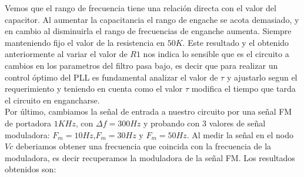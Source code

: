 \documentclass[10pt,a4paper]{IEEEtran}
\begin{document}
Vemos que el rango de frecuencia tiene una relación directa con el valor del capacitor.  Al aumentar la capacitancia el rango de 
engache se acota demasiado, y en cambio al disminuirla el rango de frecuencias de enganche aumenta. Siempre manteniendo fijo el 
valor de la resistencia en $50K$. Este resultado y el obtenido anteriormente al variar el valor de $R1$ nos indica lo sensible que es el circuito 
a cambios en los parametros del filtro pasa bajo, es decir que para realizar un control óptimo del PLL es fundamental analizar el valor de $\tau$ y 
ajustarlo segun el requerimiento y teniendo en cuenta como el valor $\tau$ modifica el tiempo que tarda el circuito en engancharse.\\

Por último, cambiamos la señal de entrada a nuestro circuito por una señal FM de portadora $1KHz$, con $\Delta f=300Hz$ y probando con 3 valores de señal 
moduladora: $F_m=10Hz$,$F_m=30Hz$ y $F_m=50Hz$. Al medir la señal en el nodo $Vc$ deberiamos obtener una frecuencia que coincida con la frecuencia de la moduladora, es decir 
recuperamos la moduladora de la señal FM. Los resultados obtenidos son:
\end{document}
